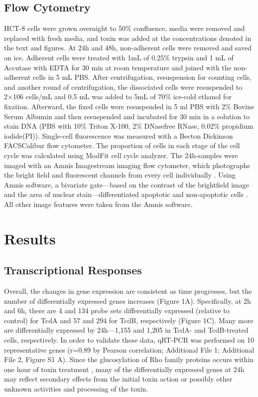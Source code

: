 \subsection{Flow Cytometry}
HCT-8 cells were grown overnight to 50\% confluence, media were removed and replaced with fresh media, and toxin was added at the concentrations denoted in the text and figures. At 24h and 48h, non-adherent cells were removed and saved on ice. Adherent cells were treated with 1mL of 0.25\% trypsin and 1 mL of Accutase with EDTA for 30 min at room temperature and joined with the non-adherent cells in 5 mL PBS. After centrifugation, resuspension for counting cells, and another round of centrifugation, the dissociated cells were resuspended to 2×106 cells/mL and 0.5 mL was added to 5mL of 70\% ice-cold ethanol for fixation. Afterward, the fixed cells were resuspended in 5 ml PBS with 2\% Bovine Serum Albumin and then resuspended and incubated for 30 min in a solution to stain DNA (PBS with 10\% Triton X-100, 2\% DNasefree RNase, 0.02\% propidium iodide(PI)). Single-cell fluorescence was measured with a Becton Dickinson FACSCalibur flow cytometer. The proportion of cells in each stage of the cell cycle was calculated using ModFit cell cycle analyzer. The 24h-samples were imaged with an Amnis Imagestream imaging flow cytometer, which photographs the bright field and fluorescent channels from every cell individually \cite{George:2004jj}. Using Amnis software, a bivariate gate—based on the contrast of the brightfield image and the area of nuclear stain—differentiated apoptotic and non-apoptotic cells \cite{Henery:2008jz}. All other image features were taken from the Amnis software.

\section{Results}

\subsection{Transcriptional Responses}

Overall, the changes in gene expression are consistent as time progresses, but the number of differentially expressed genes increases (Figure 1A). Specifically, at 2h and 6h, there are 4 and 134 probe sets differentially expressed (relative to control) for TcdA and 57 and 294 for TcdB, respectively (Figure 1C).  Many more are differentially expressed by 24h—1,155 and 1,205 in TcdA- and TcdB-treated cells, respectively. In order to validate these data, qRT-PCR was performed on 10 representative genes (r=0.89 by Pearson correlation; Additional File 1; Additional File 2, Figure S1 A). Since the glucosylation of Rho family proteins occurs within one hour of toxin treatment \cite{ChavesOlarte:1997cs}, many of the differentially expressed genes at 24h may reflect secondary effects from the initial toxin action or possibly other unknown activities and processing of the toxin.

